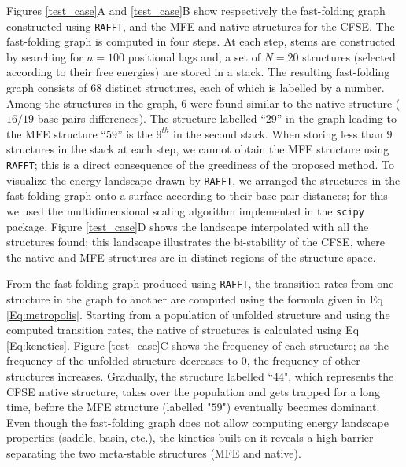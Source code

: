 Figures \ref{test_case}A and \ref{test_case}B show respectively the fast-folding graph constructed using \texttt{RAFFT}, and the MFE and native structures for the CFSE. The fast-folding graph is computed in four steps. At each step, stems are constructed by searching for $n=100$ positional lags and, a set of $N=20$ structures (selected according to their free energies) are stored in a stack. The resulting fast-folding graph consists of $68$ distinct structures, each of which is labelled by a number. Among the structures in the graph, $6$ were found similar to the native structure ($16/19$ base pairs differences). The structure labelled ``$29$'' in the graph leading to the MFE structure ``$59$'' is the $9^{th}$ in the second stack. When storing less than $9$ structures in the stack at each step, we cannot obtain the MFE structure using \texttt{RAFFT}; this is a direct consequence of the greediness of the proposed method. To visualize the energy landscape drawn by \texttt{RAFFT}, we arranged the structures in the fast-folding graph onto a surface according to their base-pair distances; for this we used the multidimensional scaling algorithm implemented in the \texttt{scipy} package.  Figure \ref{test_case}D shows the landscape interpolated with all the structures found; this landscape illustrates the bi-stability of the CFSE, where the native and MFE structures are in distinct regions of the structure space.

From the fast-folding graph produced using \texttt{RAFFT}, the transition rates from one structure in the graph to another are computed using the formula given in Eq \ref{Eq:metropolis}. Starting from a population of unfolded structure and using the computed transition rates, the native of structures is calculated using Eq \ref{Eq:kenetics}. Figure \ref{test_case}C shows the frequency of each structure; as the frequency of the unfolded structure decreases to $0$, the frequency of other structures increases. Gradually, the structure labelled ``$44$", which represents the CFSE native structure, takes over the population and gets trapped for a long time, before the MFE structure (labelled "$59$") eventually becomes dominant. Even though the fast-folding graph does not allow computing energy landscape properties (saddle, basin, etc.), the kinetics built on it reveals a high barrier separating the two meta-stable structures (MFE and native). 

